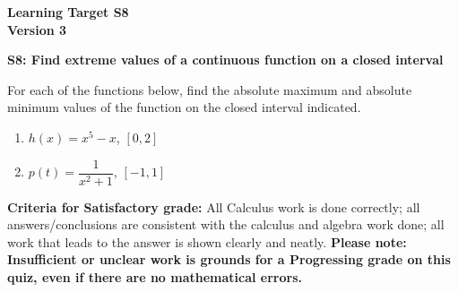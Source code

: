 \documentclass[10pt]{article}
\begin{document}
	\vspace*{0in}

		\begin{center}
			\textbf{Learning Target S8 \\
			Version 3} 
		\end{center}


\begin{framed}
	\textbf{S8: Find extreme values of a continuous function on a closed interval}
\end{framed}

For each of the functions below, find the absolute maximum and absolute minimum values of the function on the closed interval indicated. 



\begin{enumerate}
    \item $h(x) = x^5 - x$, $[0,2]$
    \item $p(t) = \dfrac{1}{x^2 + 1}$, $[-1,1]$
\end{enumerate}

\vfill

\begin{small}
    \begin{framed}
        	\textbf{Criteria for Satisfactory grade:} All Calculus work is done correctly; all answers/conclusions are consistent with the calculus and algebra work done; all work that leads to the answer is shown clearly and neatly. \textbf{Please note: Insufficient or unclear work is grounds for a Progressing grade on this quiz, even if there are no mathematical errors.}
    \end{framed}

\end{small}
\end{document}
